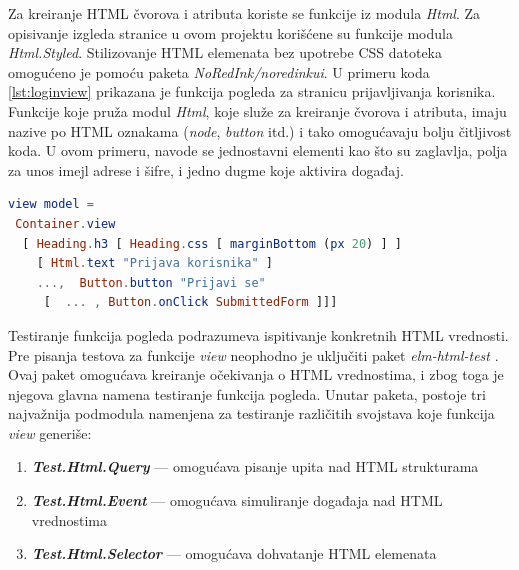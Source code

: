 \documentclass[12pt,oneside]{memoir}
\begin{document}
\par Za kreiranje HTML čvorova i atributa koriste se funkcije iz modula \emph{Html}. Za opisivanje izgleda stranice u ovom projektu korišćene su funkcije modula \emph{Html.Styled}. Stilizovanje HTML elemenata bez upotrebe CSS datoteka omogućeno je pomoću paketa \emph{NoRedInk/noredinkui}. U primeru koda \ref{lst:loginview} prikazana je funkcija pogleda za stranicu prijavljivanja korisnika. Funkcije koje pruža modul \emph{Html}, koje služe za kreiranje čvorova i atributa, imaju nazive po HTML oznakama (\emph{node}, \emph{button} itd.) i tako omogućavaju bolju čitljivost koda. U ovom primeru, navode se jednostavni elementi kao što su zaglavlja, polja za unos imejl adrese i šifre, i jedno dugme koje aktivira događaj. 

\begin{minipage}{\linewidth}
\begin{lstlisting}[language=elm, basicstyle=\small, caption={Funkcija \emph{view} modula \emph{LoginPage}},captionpos=b, label={lst:loginview}]
view model =
 Container.view
  [ Heading.h3 [ Heading.css [ marginBottom (px 20) ] ] 
  	[ Html.text "Prijava korisnika" ]
    ...,  Button.button "Prijavi se"
     [  ... , Button.onClick SubmittedForm ]]]
\end{lstlisting}
\end{minipage}

\par Testiranje funkcija pogleda podrazumeva ispitivanje konkretnih HTML vrednosti. Pre pisanja testova za funkcije \emph{view} neophodno je uključiti paket \emph{elm-html-test} \cite{html-elm-test}. Ovaj paket omogućava kreiranje očekivanja o HTML vrednostima, i zbog toga je njegova glavna namena testiranje funkcija pogleda. Unutar paketa, postoje tri najvažnija podmodula namenjena za testiranje različitih svojstava koje funkcija \emph{view} generiše:

\begin{enumerate}
\item \textbf{\emph{Test.Html.Query}} --- omogućava pisanje upita nad HTML strukturama
\item \textbf{\emph{Test.Html.Event}} --- omogućava simuliranje događaja nad HTML vrednostima
\item \textbf{\emph{Test.Html.Selector}} --- omogućava dohvatanje HTML elemenata
\end{enumerate}
\end{document}

